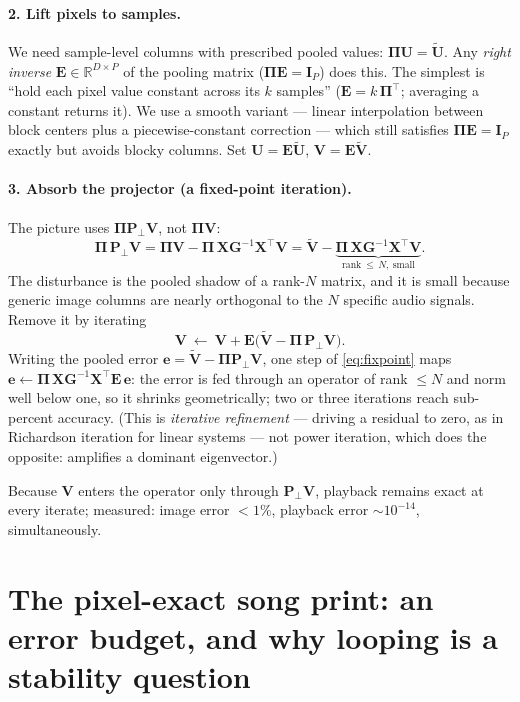 \documentclass[11pt]{article}
\newcommand{\mX}{\bm{X}}
\newcommand{\mG}{\bm{G}}
\newcommand{\mI}{\bm{I}}
\newcommand{\mPp}{\bm{P}_{\!\perp}}
\newcommand{\mU}{\bm{U}}
\newcommand{\mV}{\bm{V}}
\newcommand{\pool}{\bm{\Pi}}
\newcommand{\liftop}{\bm{E}}
\newcommand{\ve}{\bm{e}}
\newcommand{\R}{\mathbb{R}}
\begin{document}
\paragraph{2. Lift pixels to samples.} We need sample-level columns with
prescribed pooled values: $\pool\mU = \widetilde{\mU}$. Any \emph{right
inverse} $\liftop \in \R^{D\times P}$ of the pooling matrix
($\pool\liftop = \mI_P$) does this. The simplest is ``hold each pixel value
constant across its $k$ samples'' ($\liftop = k\,\pool^\top$; averaging a
constant returns it). We use a smooth variant --- linear interpolation
between block centers plus a piecewise-constant correction --- which still
satisfies $\pool\liftop = \mI_P$ exactly but avoids blocky columns. Set
$\mU = \liftop\widetilde{\mU}$, $\mV = \liftop\widetilde{\mV}$.

\paragraph{3. Absorb the projector (a fixed-point iteration).} The picture
uses $\pool\mPp\mV$, not $\pool\mV$:
\begin{equation}
  \pool\,\mPp\mV
  = \pool\mV - \pool\,\mX\mG^{-1}\mX^{\top}\mV
  = \widetilde{\mV} - \underbrace{\pool\,\mX\mG^{-1}\mX^\top\mV}_{\text{rank}\ \le\, N,\ \text{small}} .
\end{equation}
The disturbance is the pooled shadow of a rank-$N$ matrix, and it is small
because generic image columns are nearly orthogonal to the $N$ specific
audio signals. Remove it by iterating
\begin{equation}
  \mV \ \leftarrow\ \mV + \liftop\bigl(\widetilde{\mV} - \pool\,\mPp\mV\bigr).
  \label{eq:fixpoint}
\end{equation}
Writing the pooled error $\ve = \widetilde{\mV} - \pool\mPp\mV$, one step
of \eqref{eq:fixpoint} maps
$\ve \leftarrow \pool\,\mX\mG^{-1}\mX^\top\liftop\,\ve$: the error is fed
through an operator of rank $\le N$ and norm well below one, so it shrinks
geometrically; two or three iterations reach sub-percent accuracy. (This is
\emph{iterative refinement} --- driving a residual to zero, as in Richardson
iteration for linear systems --- not power iteration, which does the
opposite: amplifies a dominant eigenvector.)

Because $\mV$ enters the operator only through $\mPp\mV$, playback remains
exact at every iterate; measured: image error $<1\%$, playback error
$\sim\!10^{-14}$, simultaneously.

\section{The pixel-exact song print: an error budget, and why looping is
a stability question}
\end{document}
